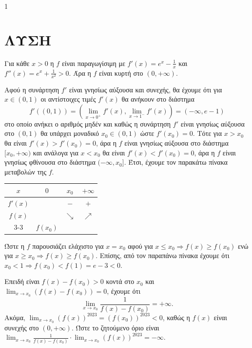 \begin{ylh}{1}
    \item [Ύλη από εικόνα]
\end{ylh}
\section*{ΛΥΣΗ}
\begin{alist}
\item Για κάθε $x > 0$ η $f$ είναι παραγωγίσιμη με $f'(x) = e^x - \frac{1}{x}$ και $f''(x) = e^x + \frac{1}{x^2} > 0$.
Άρα η $f$ είναι κυρτή στο $(0, +\infty)$.
\item Αφού η συνάρτηση $f'$ είναι γνησίως αύξουσα και συνεχής, θα έχουμε ότι για $x \in (0,1)$ οι αντίστοιχες τιμές $f'(x)$ θα ανήκουν στο διάστημα
\[ f'((0,1)) = \left(\lim_{x\to 0^+} f'(x), \lim_{x\to 1^-} f'(x)\right) = (-\infty, e-1) \]
στο οποίο ανήκει ο αριθμός μηδέν και καθώς η συνάρτηση $f'$ είναι γνησίως αύξουσα στο $(0,1)$ θα υπάρχει μοναδικό $x_0 \in (0,1)$ ώστε $f'(x_0) = 0$.
Τότε για $x > x_0$ θα είναι $f'(x) > f'(x_0) = 0$, άρα η $f$ είναι γνησίως αύξουσα στο διάστημα $[x_0, +\infty)$ και ανάλογα
για $x < x_0$ θα είναι $f'(x) < f'(x_0) = 0$, άρα η $f$ είναι γνησίως φθίνουσα στο διάστημα $(-\infty, x_0]$. Έτσι, έχουμε τον παρακάτω πίνακα μεταβολών της $f$.
\begin{center}
\begin{tabular}{|c|c|c|c|}
    \hline
    $x$ & $0$ & $x_0$ & $+\infty$ \\
    \hline
    $f'(x)$ & \rule{0pt}{1.2em} & $-$ & $+$ \\
    \hline
    $f(x)$ & \rule{0pt}{1.2em} & $\searrow$ & $\nearrow$ \\
    \cline{3-3} %
    \multicolumn{2}{|c|}{} & $f(x_0)$ & \\
    \hline
\end{tabular}
\end{center}
Ώστε η $f$ παρουσιάζει ελάχιστο για $x=x_0$ αφού για $x \le x_0 \Rightarrow f(x) \ge f(x_0)$ ενώ για $x \ge x_0 \Rightarrow f(x) \ge f(x_0)$.
Επίσης, από τον παραπάνω πίνακα έχουμε ότι $x_0 < 1 \Rightarrow f(x_0) < f(1) = e-3 < 0$.
\item Επειδή είναι $f(x) - f(x_0) > 0$ κοντά στο $x_0$ και $\lim_{x\to x_0} (f(x) - f(x_0)) = 0$, έχουμε ότι
\[ \lim_{x\to x_0} \frac{1}{f(x)-f(x_0)} = +\infty. \]
Ακόμα, $\lim_{x\to x_0} (f(x))^{2023} = (f(x_0))^{2023} < 0$, καθώς η $f(x)$ είναι συνεχής στο $(0, +\infty)$.
Ώστε το ζητούμενο όριο είναι $\lim_{x\to x_0} \frac{1}{f(x)-f(x_0)} \cdot \lim_{x\to x_0} (f(x))^{2023} = -\infty$.
\end{alist}